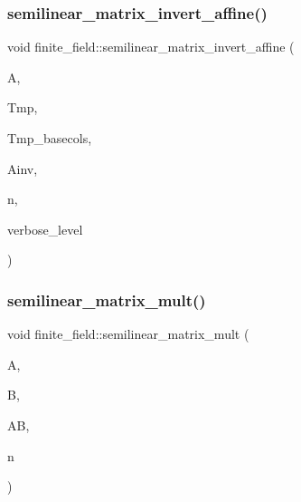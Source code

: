 \mbox{\label{classfinite__field_a23db70e745bf22d230da684440e1fc59}} 
\subsubsection{\texorpdfstring{semilinear\+\_\+matrix\+\_\+invert\+\_\+affine()}{semilinear\_matrix\_invert\_affine()}}
{\footnotesize\ttfamily void finite\+\_\+field\+::semilinear\+\_\+matrix\+\_\+invert\+\_\+affine (\begin{DoxyParamCaption}\item[{\mbox{\hyperlink{galois_8h_a09fddde158a3a20bd2dcadb609de11dc}{I\+NT}} $\ast$}]{A,  }\item[{\mbox{\hyperlink{galois_8h_a09fddde158a3a20bd2dcadb609de11dc}{I\+NT}} $\ast$}]{Tmp,  }\item[{\mbox{\hyperlink{galois_8h_a09fddde158a3a20bd2dcadb609de11dc}{I\+NT}} $\ast$}]{Tmp\+\_\+basecols,  }\item[{\mbox{\hyperlink{galois_8h_a09fddde158a3a20bd2dcadb609de11dc}{I\+NT}} $\ast$}]{Ainv,  }\item[{\mbox{\hyperlink{galois_8h_a09fddde158a3a20bd2dcadb609de11dc}{I\+NT}}}]{n,  }\item[{\mbox{\hyperlink{galois_8h_a09fddde158a3a20bd2dcadb609de11dc}{I\+NT}}}]{verbose\+\_\+level }\end{DoxyParamCaption})}

\mbox{\label{classfinite__field_ae4375445464ee04a935653b51001b6fc}} 
\subsubsection{\texorpdfstring{semilinear\+\_\+matrix\+\_\+mult()}{semilinear\_matrix\_mult()}}
{\footnotesize\ttfamily void finite\+\_\+field\+::semilinear\+\_\+matrix\+\_\+mult (\begin{DoxyParamCaption}\item[{\mbox{\hyperlink{galois_8h_a09fddde158a3a20bd2dcadb609de11dc}{I\+NT}} $\ast$}]{A,  }\item[{\mbox{\hyperlink{galois_8h_a09fddde158a3a20bd2dcadb609de11dc}{I\+NT}} $\ast$}]{B,  }\item[{\mbox{\hyperlink{galois_8h_a09fddde158a3a20bd2dcadb609de11dc}{I\+NT}} $\ast$}]{AB,  }\item[{\mbox{\hyperlink{galois_8h_a09fddde158a3a20bd2dcadb609de11dc}{I\+NT}}}]{n }\end{DoxyParamCaption})}

